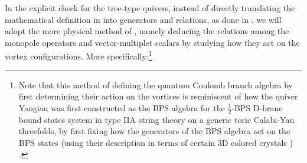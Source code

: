 \documentclass[12pt,a4paper]{article}
\renewcommand{\(}{\left(}
\renewcommand{\)}{\right)}
\renewcommand{\(}{\left(}
\renewcommand{\)}{\right)}
\begin{document}
In the explicit check for the tree-type quivers, instead of directly translating the mathematical definition in \cite{Braverman:2016wma,Braverman:2016pwk} into generators and relations, as done in \cite{Braverman:2016pwk,Kodera:2016faj_jordan_quiver, Nakajima:2019olw}, we will adopt the more physical method of \cite{Bullimore:2016hdc}, namely deducing the relations among the monopole operators and vector-multiplet scalars by studying how they act on the vortex configurations.
More specifically:\footnote{Note that this method of defining the quantum Coulomb branch algebra by first determining their action on the vortices is reminiscent of how the quiver Yangian was first constructed as  the BPS algebra for the $\frac{1}{2}$-BPS D-brane bound states system in type IIA string theory on a generic toric Calabi-Yau threefolds, by first fixing how the  generators of the BPS algebra act on the BPS states (using their description in terms of certain 3D colored crystals \cite{Ooguri:2008yb})
	\cite{Li:2020rij}. 
}
\end{document}
